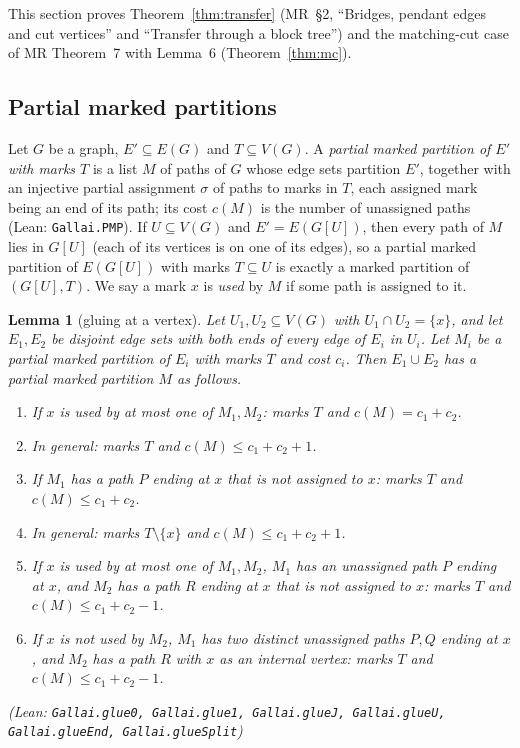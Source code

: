 \documentclass[11pt]{amsart}
\newtheorem{lemma}[theorem]{Lemma}
\theoremstyle{definition}
\theoremstyle{remark}
\renewcommand{\_}{\oldunderscore\allowbreak}
\newcommand{\lean}[1]{\textup{(Lean: {\small\texttt{#1}})}}
\newcommand{\leanst}[1]{\par{\raggedright\small\textup{(Lean: \texttt{#1})}\par}}
\begin{document}
This section proves Theorem~\ref{thm:transfer} (MR~\S2, ``Bridges, pendant edges and cut
vertices'' and ``Transfer through a block tree'') and the matching-cut case of MR Theorem~7 with
Lemma~6 (Theorem~\ref{thm:mc}).

\subsection{Partial marked partitions}
Let $G$ be a graph, $E'\subseteq E(G)$ and $T\subseteq V(G)$. A \emph{partial marked partition of
$E'$ with marks $T$} is a list $M$ of paths of $G$ whose edge sets partition $E'$, together with an
injective partial assignment $\sigma$ of paths to marks in $T$, each assigned mark being an end of
its path; its cost $c(M)$ is the number of unassigned paths \lean{Gallai.PMP}. If $U\subseteq V(G)$
and $E'=E(G[U])$, then every path of $M$ lies in $G[U]$ (each of its vertices is on one of its
edges), so a partial marked partition of $E(G[U])$ with marks $T\subseteq U$ is exactly a marked
partition of $(G[U],T)$. We say a mark $x$ is \emph{used} by $M$ if some path is assigned to it.

\begin{lemma}[gluing at a vertex]\label{lem:glue}
Let $U_1,U_2\subseteq V(G)$ with $U_1\cap U_2=\{x\}$, and let $E_1,E_2$ be disjoint edge sets with
both ends of every edge of $E_i$ in $U_i$. Let $M_i$ be a partial marked partition of $E_i$ with
marks $T$ and cost $c_i$. Then $E_1\cup E_2$ has a partial marked partition $M$ as follows.
\begin{enumerate}[label=\textup{(G\arabic*)},leftmargin=3.2em]
\item If $x$ is used by at most one of $M_1,M_2$: marks $T$ and $c(M)=c_1+c_2$.
\item In general: marks $T$ and $c(M)\le c_1+c_2+1$.
\item If $M_1$ has a path $P$ ending at $x$ that is not assigned to $x$: marks $T$ and
$c(M)\le c_1+c_2$.
\item In general: marks $T\setminus\{x\}$ and $c(M)\le c_1+c_2+1$.
\item If $x$ is used by at most one of $M_1,M_2$, $M_1$ has an unassigned path $P$ ending at $x$, and
$M_2$ has a path $R$ ending at $x$ that is not assigned to $x$: marks $T$ and $c(M)\le c_1+c_2-1$.
\item If $x$ is not used by $M_2$, $M_1$ has two distinct unassigned paths $P,Q$ ending at $x$, and
$M_2$ has a path $R$ with $x$ as an internal vertex: marks $T$ and $c(M)\le c_1+c_2-1$.
\end{enumerate}
\leanst{Gallai.glue0, Gallai.glue1, Gallai.glueJ, Gallai.glueU, Gallai.glueEnd,
Gallai.glueSplit}
\end{lemma}
\end{document}
